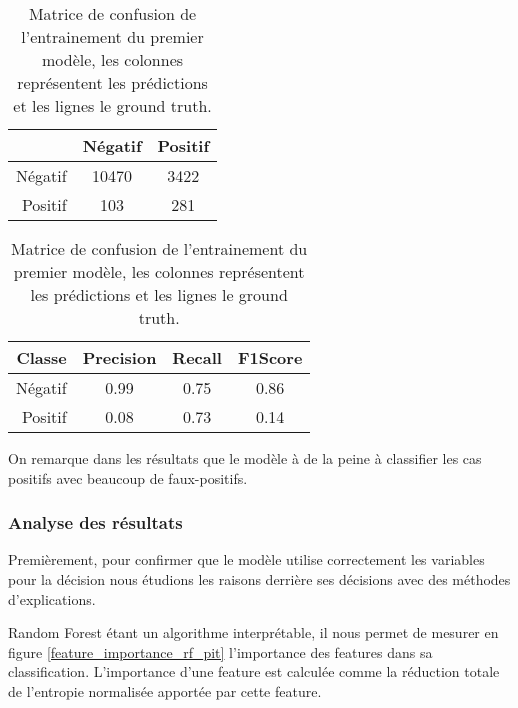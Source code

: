 \begin{table}[H]
    \begin{center}
        \caption{\label{rf_matrix}Matrice de confusion de l'entrainement du premier modèle, les colonnes représentent les prédictions et les lignes le ground truth.}
        \begin{tabular}{r|cc}
                    & Négatif & Positif \\ \hline
            Négatif & 10470   & 3422    \\
            Positif & 103     & 281     \\
        \end{tabular}
    \end{center}
\end{table}

\begin{table}[H]
    \begin{center}
        \caption{\label{rf_results}Matrice de confusion de l'entrainement du premier modèle, les colonnes représentent les prédictions et les lignes le ground truth.}
        \begin{tabular}{r|ccc}
            Classe  & Precision & Recall & F1Score \\ \hline
            Négatif & 0.99      & 0.75   & 0.86    \\
            Positif & 0.08      & 0.73   & 0.14    \\
        \end{tabular}
    \end{center}
\end{table}

On remarque dans les résultats que le modèle à de la peine à classifier les cas positifs avec beaucoup de faux-positifs.

\subsubsection{Analyse des résultats}
Premièrement, pour confirmer que le modèle utilise correctement les variables pour la décision nous étudions les raisons derrière ses décisions avec des méthodes d'explications.

Random Forest étant un algorithme interprétable, il nous permet de mesurer en figure \ref{feature_importance_rf_pit} l'importance des features dans sa classification.
L'importance d'une feature est calculée comme la réduction totale de l'entropie normalisée apportée par cette feature.

